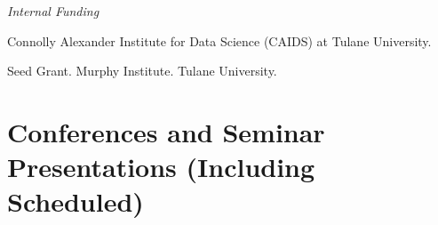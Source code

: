 \documentclass[letterpaper]{article}
\renewenvironment{itemize}{
  \begin{list}{}{
    \setlength{\leftmargin}{1.5em}
  }
}{
  \end{list}
}
\begin{document}
\textit{Internal Funding} \\
\begin{itemize}
  \item {} {}Connolly Alexander Institute for Data Science (CAIDS) at Tulane University.
\end{itemize}

\vspace{2 mm}
\begin{itemize}
  \item {} {}Seed Grant. Murphy Institute. Tulane University.
\end{itemize}

\section*{Conferences and Seminar Presentations (Including Scheduled)}
\vspace{2 mm}
\end{document}
